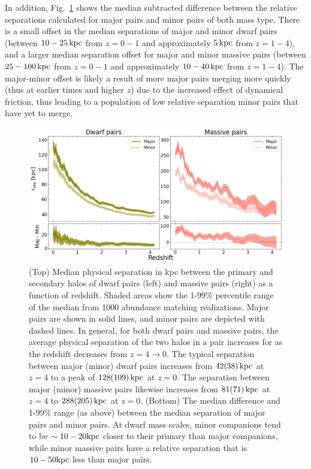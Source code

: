 \documentclass[twocolumn]{aastex631}
\begin{document}
        In addition, Fig.~\ref{fig:sep} shows the median subtracted difference between the relative separations calculated for major pairs and minor pairs of both mass type. 
        There is a small offset in the median separations of major and minor dwarf pairs (between $10-25\,\mathrm{kpc}$ from  $z=0-1$ and approximately $5\,\mathrm{kpc}$ from $z=1-4$), and a larger median separation offset for major and minor massive pairs (between $25-100\,\mathrm{kpc}$ from  $z=0-1$ and approximately $10-40\,\mathrm{kpc}$ from $z=1-4$). 
        The major-minor offset is likely a result of more major pairs merging more quickly (thus at earlier times and higher $z$) due to the increased effect of dynamical friction, thus leading to a population of low relative separation minor pairs that have yet to merge.  
    
        \begin{figure}[htp]
          \centering
          \includegraphics[width=\textwidth]{sep_1000.png}
          \caption{(Top) Median physical separation in kpc between the primary and secondary halos of dwarf pairs (left) and massive pairs (right) as a function of redshift. 
          Shaded areas show the 1-99\% percentile range of the median from 1000 abundance matching realizations. 
          Major pairs are shown in solid lines, and minor pairs are depicted with dashed lines.
          In general, for both dwarf pairs and massive pairs, the average physical separation of the two halos in a pair increases for as the redshift decreases from $z=4\to0$. 
          The typical separation between major (minor) dwarf pairs increases from $42(38)\,\mathrm{kpc}$ at $z=4$ to a peak of $128(109)\,\mathrm{kpc}$ at $z=0$.
          The separation between major (minor) massive pairs likewise increases from $81(71)\,\mathrm{kpc}$ at $z=4$ to $288(205)\,\mathrm{kpc}$ at  $z=0$.
          (Bottom) The median difference and 1-99\% range (as above) between the median separation of major pairs and minor pairs.
          At dwarf mass scales, minor companions tend to be $\sim10-20\mathrm{kpc}$ closer to their primary than major companions, while minor massive pairs have a relative separation that is $10-50\mathrm{kpc}$ less than major pairs.
            }
          \label{fig:sep}
        \end{figure}
    
\end{document}
